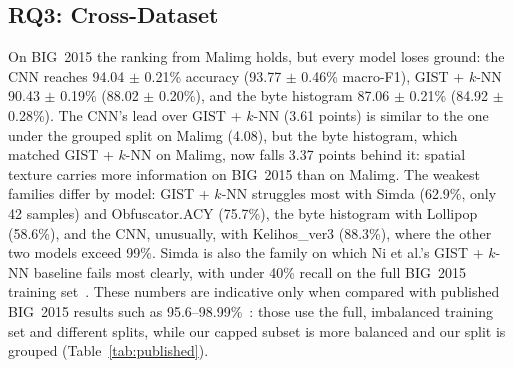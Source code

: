 \documentclass[conference]{IEEEtran}
\begin{document}
\subsection{RQ3: Cross-Dataset}
On BIG~2015 the ranking from Malimg holds, but every model loses ground: the CNN
reaches 94.04 $\pm$ 0.21\% accuracy (93.77 $\pm$ 0.46\% macro-F1), GIST + $k$-NN
90.43 $\pm$ 0.19\% (88.02 $\pm$ 0.20\%), and the byte histogram 87.06 $\pm$ 0.21\%
(84.92 $\pm$ 0.28\%).
The CNN's lead over GIST + $k$-NN (3.61 points) is similar to the one under
the grouped split on Malimg (4.08), but the byte histogram, which matched GIST
+ $k$-NN on Malimg, now falls 3.37 points behind it: spatial texture carries
more information on BIG~2015 than on Malimg.
The weakest families differ by model: GIST + $k$-NN struggles most with Simda
(62.9\%, only 42 samples) and Obfuscator.ACY (75.7\%), the byte
histogram with Lollipop (58.6\%), and the CNN, unusually, with Kelihos\_ver3
(88.3\%), where the other two models exceed 99\%. Simda is also the family on which
Ni et al.'s GIST + $k$-NN baseline fails most clearly, with under 40\% recall on the
full BIG~2015 training set~\cite{ni2018simhash}.
These numbers are indicative only when compared with published BIG~2015 results such
as 95.6--98.99\%~\cite{kalash2018mcnn,gibert2019cnn,ni2018simhash}: those use the full, imbalanced training set and
different splits, while our capped subset is more balanced and our split is grouped
(Table~\ref{tab:published}).
\end{document}
